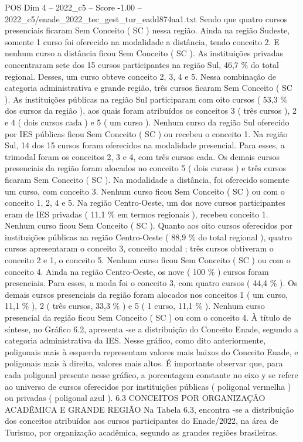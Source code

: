 \begin{textsample}{POS Dim 4 – 2022\_c5 – Score -1.00 – 2022\_c5/enade\_2022\_tec\_gest\_tur\_eadd874aa1.txt}
Sendo que quatro cursos presenciais ficaram Sem Conceito ( SC ) nessa região.
Ainda na região Sudeste, somente 1 curso foi oferecido na modalidade a distância, tendo conceito 2.
E nenhum curso a distância ficou Sem Conceito ( SC ).
As instituições privadas concentraram sete dos 15 cursos participantes na região Sul, 46,7 \% do total regional.
Desses, um curso obteve conceito 2, 3, 4 e 5.
Nessa combinação de categoria administrativa e grande região, três cursos ficaram Sem Conceito ( SC ).
As instituições públicas na região Sul participaram com oito cursos ( 53,3 \% dos cursos da região ), aos quais foram atribuídos os conceitos 3 ( três cursos ), 2 e 4 ( dois cursos cada ) e 5 ( um curso ).
Nenhum curso da região Sul oferecido por IES públicas ficou Sem Conceito ( SC ) ou recebeu o conceito 1.
Na região Sul, 14 dos 15 cursos foram oferecidos na modalidade presencial.
Para esses, a trimodal foram os conceitos 2, 3 e 4, com três cursos cada.
Os demais cursos presenciais da região foram alocados no conceito 5 ( dois cursos ) e três cursos ficaram Sem Conceito ( SC ).
Na modalidade a distância, foi oferecido somente um curso, com conceito 3.
Nenhum curso ficou Sem Conceito ( SC ) ou com o conceito 1, 2, 4 e 5.
Na região Centro-Oeste, um dos nove cursos participantes eram de IES privadas ( 11,1 \% em termos regionais ), recebeu conceito 1.
Nenhum curso ficou Sem Conceito ( SC ).
Quanto aos oito cursos oferecidos por instituições públicas na região Centro-Oeste ( 88,9 \% do total regional ), quatro cursos apresentaram o conceito 3, conceito modal ; três cursos obtiveram o conceito 2 e 1, o conceito 5.
Nenhum curso ficou Sem Conceito ( SC ) ou com o conceito 4.
Ainda na região Centro-Oeste, os nove ( 100 \% ) cursos foram presenciais.
Para esses, a moda foi o conceito 3, com quatro cursos ( 44,4 \% ).
Os demais cursos presenciais da região foram alocados nos conceitos 1 ( um curso, 11,1 \% ), 2 ( três cursos, 33,3 \% ) e 5 ( 1 curso, 11,1 \% ).
Nenhum curso presencial da região ficou Sem Conceito ( SC ) ou com o conceito 4.
À título de síntese, no Gráfico 6.2, apresenta -se a distribuição do Conceito Enade, segundo a categoria administrativa da IES.
Nesse gráfico, como dito anteriormente, poligonais mais à esquerda representam valores mais baixos do Conceito Enade, e poligonais mais à direita, valores mais altos.
É importante observar que, para cada poligonal presente nesse gráfico, a porcentagem constante no eixo y se refere ao universo de cursos oferecidos por instituições públicas ( poligonal vermelha ) ou privadas ( poligonal azul ). 6.3 CONCEITOS POR ORGANIZAÇÃO ACADÊMICA E GRANDE REGIÃO Na Tabela 6.3, encontra -se a distribuição dos conceitos atribuídos aos cursos participantes do Enade/2022, na área de Turismo, por organização acadêmica, segundo as grandes regiões brasileiras.

\end{textsample}
